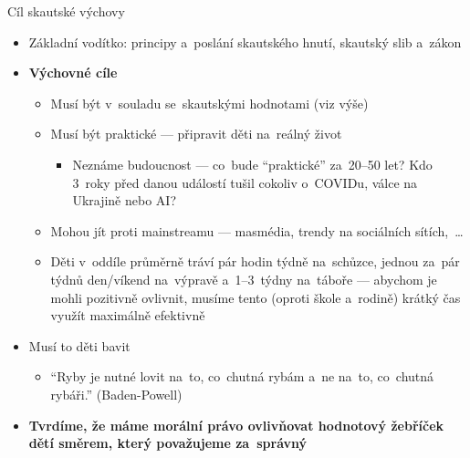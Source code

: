 \documentclass[compress, xelatex, 11pt, xcolor=dvipsnames, aspectratio=169, url={hyphens, lowtilde}]{beamer}
\begin{document}
\begin{frame}{Cíl skautské výchovy}
	\begin{itemize}
		\item Základní vodítko: principy a~poslání skautského hnutí, skautský slib a~zákon
		\item \textbf{Výchovné cíle}
		\begin{itemize}
			\item Musí být v~souladu se~skautskými hodnotami (viz výše)
			\item Musí být praktické --- připravit děti na~reálný život
			\begin{itemize}
		\item Neznáme budoucnost --- co~bude \enquote{praktické} za~20--50 let? Kdo 3~roky před danou událostí tušil cokoliv o~COVIDu, válce na Ukrajině nebo AI?
			\end{itemize}
			\item Mohou jít proti mainstreamu --- masmédia, trendy na sociálních sítích,~\ldots
			\item Děti v~oddíle průměrně tráví pár hodin týdně na~schůzce, jednou za~pár týdnů den/víkend na~výpravě a~1--3~týdny na~táboře --- abychom je mohli pozitivně ovlivnit, musíme tento (oproti škole a~rodině) krátký čas využít maximálně efektivně
		\end{itemize}
		\item Musí to děti bavit
			\begin{itemize}
		\item \enquote{Ryby je nutné lovit na~to, co~chutná rybám a~ne na~to, co~chutná rybáři.} (Baden-Powell)
			\end{itemize}
		\item \textbf{Tvrdíme, že máme morální právo ovlivňovat hodnotový žebříček dětí směrem, který považujeme za~správný}
	\end{itemize}
\end{frame}
\end{document}
